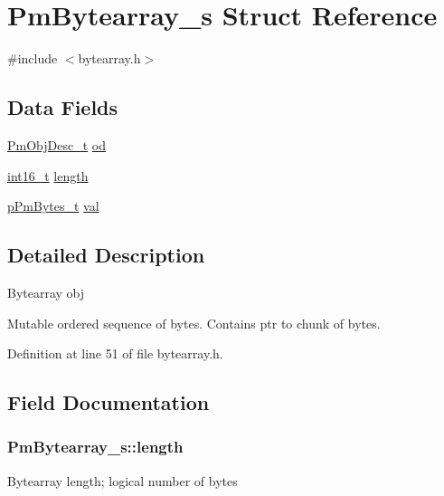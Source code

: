 \hypertarget{struct_pm_bytearray__s}{\section{Pm\-Bytearray\-\_\-s Struct Reference}
\label{struct_pm_bytearray__s}
}


{\ttfamily \#include $<$bytearray.\-h$>$}

\subsection*{Data Fields}
\begin{DoxyCompactItemize}
\item 
\hyperlink{obj_8h_a72d816790acd8eb550fb25268c2b3489}{Pm\-Obj\-Desc\-\_\-t} \hyperlink{struct_pm_bytearray__s_ac30a5f7ed0f5b86d794054363462013e}{od}
\item 
\hyperlink{stdint_8h_aa343fa3b3d06292b959ffdd4c4703b06}{int16\-\_\-t} \hyperlink{struct_pm_bytearray__s_a6d434645fbc374ddfdf4ee9c9571a822}{length}
\item 
\hyperlink{bytearray_8h_a0c491cc0b73879259426830b6b4cb7d0}{p\-Pm\-Bytes\-\_\-t} \hyperlink{struct_pm_bytearray__s_a050a072fa01f5a42c5f25e2d1ff54fe5}{val}
\end{DoxyCompactItemize}


\subsection{Detailed Description}
Bytearray obj

Mutable ordered sequence of bytes. Contains ptr to chunk of bytes. 

Definition at line 51 of file bytearray.\-h.



\subsection{Field Documentation}
\hypertarget{struct_pm_bytearray__s_a6d434645fbc374ddfdf4ee9c9571a822}{
\subsubsection[{length}]{ Pm\-Bytearray\-\_\-s\-::length}}\label{struct_pm_bytearray__s_a6d434645fbc374ddfdf4ee9c9571a822}
Bytearray length; logical number of bytes 


